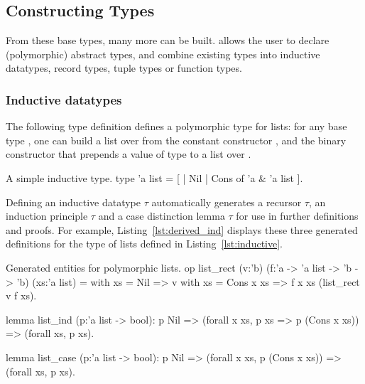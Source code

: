 
\subsection{Constructing Types}
From these base types, many more can be built. \EasyCrypt allows the user to declare
 (polymorphic) abstract types, and combine existing types into inductive datatypes,
record types, tuple types or function types.

\subsubsection*{Inductive datatypes}
The following type definition defines a polymorphic type for lists: for any
base type , one can build a list over  from the constant
constructor , and the binary constructor  that prepends a
value of type  to a list over .

\begin{easycrypt}[label={lst:inductive}]{A simple inductive type.}
type 'a list = [
  | Nil
  | Cons of 'a & 'a list ].
\end{easycrypt}

Defining an inductive datatype $\tau$ automatically generates a recursor
$\tau$, an induction principle $\tau$ and a case distinction
lemma $\tau$ for use in further definitions and proofs. For example,
Listing~\ref{lst:derived_ind} displays these three generated definitions for the
type of lists defined in Listing~\ref{lst:inductive}.

\begin{easycrypt}[label={lst:derived_ind}]{Generated entities for polymorphic lists.}
op list_rect (v:'b) (f:'a -> 'a list -> 'b -> 'b) (xs:'a list) =
  with xs = Nil        => v
  with xs = Cons x xs => f x xs (list_rect v f xs).

lemma list_ind (p:'a list -> bool):
  p Nil =>
  (forall x xs, p xs => p (Cons x xs)) =>
  (forall xs, p xs).

lemma list_case (p:'a list -> bool):
  p Nil =>
  (forall x xs, p (Cons x xs)) =>
  (forall xs, p xs).
\end{easycrypt}

